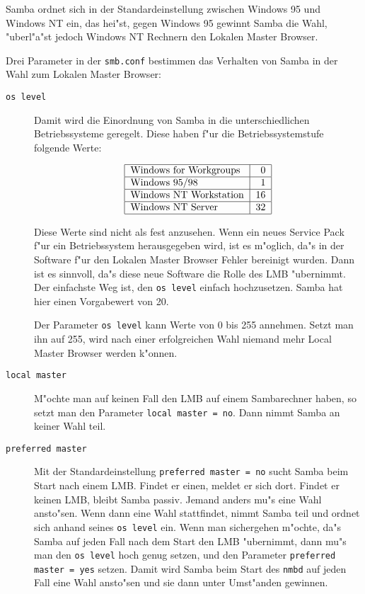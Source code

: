 \documentclass{scrartcl}
\newcommand{\prog}{\texttt}
\newcommand{\param}{\texttt}
\newcommand{\datei}{\texttt}
\begin{document}
Samba ordnet sich in der Standardeinstellung zwischen Windows 95 und
Windows NT ein, das hei"st, gegen Windows 95 gewinnt Samba die Wahl,
"uberl"a"st jedoch Windows NT Rechnern den Lokalen Master Browser.

Drei Parameter in der \datei{smb.conf} bestimmen das Verhalten von
Samba in der Wahl zum Lokalen Master Browser:

\begin{description}
  
\item[\param{os level}] Damit wird die Einordnung von Samba in die
  unterschiedlichen Betriebssysteme geregelt. Diese haben f"ur die
  Betriebssystemstufe folgende Werte:

\[\begin{tabular}{|l|r|}
\hline
Windows for Workgroups & 0 \\
\hline
Windows 95/98 & 1 \\
\hline
Windows NT Workstation & 16 \\
\hline
Windows NT Server & 32 \\
\hline
\end{tabular}\]

Diese Werte sind nicht als fest anzusehen. Wenn ein neues Service Pack
f"ur ein Betriebssystem herausgegeben wird, ist es m"oglich, da"s in
der Software f"ur den Lokalen Master Browser Fehler bereinigt wurden.
Dann ist es sinnvoll, da"s diese neue Software die Rolle des LMB
"ubernimmt. Der einfachste Weg ist, den \param{os level} einfach
hochzusetzen. Samba hat hier einen Vorgabewert von 20.

Der Parameter \param{os level} kann Werte von 0 bis 255 annehmen.
Setzt man ihn auf 255, wird nach einer erfolgreichen Wahl niemand mehr
Local Master Browser werden k"onnen.

\item[\param{local master}] M"ochte man auf keinen Fall den LMB auf
  einem Sambarechner haben, so setzt man den Parameter \param{local
    master = no}. Dann nimmt Samba an keiner Wahl teil.
  
\item[\param{preferred master}] Mit der Standardeinstellung
  \param{preferred master = no} sucht Samba beim Start nach
  einem LMB. Findet er einen, meldet er sich dort.  Findet er keinen
  LMB, bleibt Samba passiv. Jemand anders mu"s eine Wahl ansto"sen.
  Wenn dann eine Wahl stattfindet, nimmt Samba teil und ordnet sich
  anhand seines \param{os level} ein. Wenn man sichergehen m"ochte,
  da"s Samba auf jeden Fall nach dem Start den LMB "ubernimmt, dann
  mu"s man den \param{os level} hoch genug setzen, und den Parameter
  \param{preferred master = yes} setzen.  Damit wird Samba beim Start
  des \prog{nmbd} auf jeden Fall eine Wahl ansto"sen und sie dann
  unter Umst"anden gewinnen.

\end{description}
\end{document}
